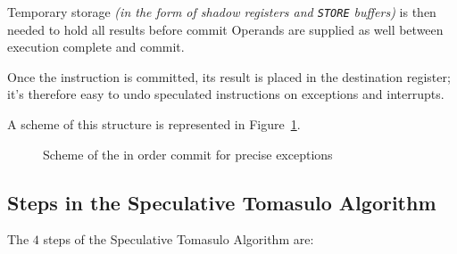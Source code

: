 \documentclass[english]{article}
\begin{document}
Temporary storage \textit{(in the form of shadow registers and \texttt{STORE} buffers)} is then needed to hold all results before commit
Operands are supplied as well between execution complete and commit.

Once the instruction is committed, its result is placed in the destination register;
it's therefore easy to undo speculated instructions on exceptions and interrupts.

A scheme of this structure is represented in Figure~\ref{fig:exceptions-in-order-commit}.

\begin{figure}[htbp]
  \bigskip
  \centering
  \caption{Scheme of the in order commit for precise exceptions}
  \label{fig:exceptions-in-order-commit}
  \bigskip
\end{figure}

\subsection{Steps in the Speculative Tomasulo Algorithm}

The \(4\) steps of the Speculative Tomasulo Algorithm are:
\end{document}
